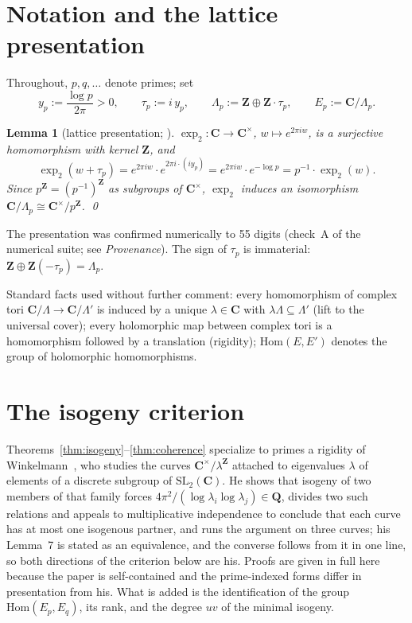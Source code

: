 \documentclass[11pt]{article}
\newtheorem{lemma}{Lemma}
\theoremstyle{definition}
\theoremstyle{remark}
\newcommand{\Z}{\mathbf{Z}}
\newcommand{\Q}{\mathbf{Q}}
\newcommand{\C}{\mathbf{C}}
\newcommand{\Hom}{\mathrm{Hom}}
\begin{document}
\section{Notation and the lattice presentation}
\label{sec:notation}

Throughout, $p, q, \dots$ denote primes; set
\[
y_p := \frac{\log p}{2\pi} > 0 , \qquad
\tau_p := i\, y_p , \qquad
\Lambda_p := \Z \oplus \Z\cdot\tau_p , \qquad
E_p := \C/\Lambda_p .
\]

\begin{lemma}[lattice presentation; {\cite[\S4.1.2]{CC26}}]
\label{lem:lattice}
$\exp_2\colon \C \to \C^\times$, $w \mapsto e^{2\pi i w}$, is a surjective
homomorphism with kernel $\Z$, and
\[
\exp_2(w + \tau_p) = e^{2\pi i w}\cdot e^{2\pi i \cdot (i y_p)}
 = e^{2\pi i w}\cdot e^{-\log p} = p^{-1}\cdot \exp_2(w) .
\]
Since $p^\Z = (p^{-1})^\Z$ as subgroups of $\C^\times$, $\exp_2$ induces an
isomorphism $\C/\Lambda_p \cong \C^\times/p^\Z$. \qed
\end{lemma}

The presentation was confirmed numerically to 55 digits (check~A of the
numerical suite; see \emph{Provenance}). The sign of $\tau_p$ is
immaterial: $\Z \oplus \Z(-\tau_p) = \Lambda_p$.

Standard facts used without further comment: every homomorphism of complex
tori $\C/\Lambda \to \C/\Lambda'$ is induced by a unique $\lambda \in \C$
with $\lambda\Lambda \subseteq \Lambda'$ (lift to the universal cover); every
holomorphic map between complex tori is a homomorphism followed by a
translation (rigidity); $\Hom(E, E')$ denotes the group of holomorphic
homomorphisms.

\section{The isogeny criterion}
\label{sec:isogeny}

Theorems~\ref{thm:isogeny}--\ref{thm:coherence} specialize to primes a
rigidity of Winkelmann~\cite[Lemma~7 and the proof of Thm.~2, p.~16]{Wi04},
who studies the curves $\C^\times/\lambda^{\Z}$ attached to eigenvalues
$\lambda$ of elements of a discrete subgroup of $\mathrm{SL}_2(\C)$. He shows
that isogeny of two members of that family forces
$4\pi^2/(\log\lambda_i \log\lambda_j) \in \Q$, divides two such relations and
appeals to multiplicative independence to conclude that each curve has at most
one isogenous partner, and runs the argument on three curves; his Lemma~7 is
stated as an equivalence, and the converse follows from it in one line, so
both directions of the criterion below are his. Proofs are given in full here
because the paper is self-contained and the prime-indexed forms differ in
presentation from his. What is added is the identification of the group
$\Hom(E_p, E_q)$, its rank, and the degree $uv$ of the minimal isogeny.
\end{document}
